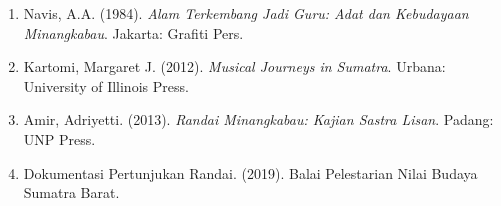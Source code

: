 \documentclass[12pt,a4paper]{article}
\begin{document}
\begin{enumerate}
\item Navis, A.A. (1984). \textit{Alam Terkembang Jadi Guru: Adat dan Kebudayaan Minangkabau}. Jakarta: Grafiti Pers.
\item Kartomi, Margaret J. (2012). \textit{Musical Journeys in Sumatra}. Urbana: University of Illinois Press.
\item Amir, Adriyetti. (2013). \textit{Randai Minangkabau: Kajian Sastra Lisan}. Padang: UNP Press.
\item Dokumentasi Pertunjukan Randai. (2019). Balai Pelestarian Nilai Budaya Sumatra Barat.
\end{enumerate}
\end{document}
